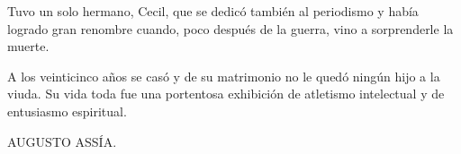 Tuvo un solo hermano, Cecil, que se dedicó también al periodismo y había logrado gran renombre
cuando, poco después de la guerra, vino a sorprenderle la muerte.

A los veinticinco años se casó y de su matrimonio no le quedó ningún hijo a la viuda.
Su vida toda fue una portentosa exhibición de atletismo intelectual y de entusiasmo espiritual.

\begin{flushright}\small
	 AUGUSTO ASSÍA.
\end{flushright}
\finalCapituloOrnamento

